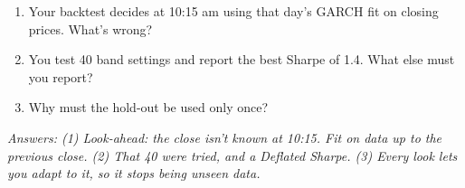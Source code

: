 \documentclass{article}
\begin{document}
\begin{enumerate}

\item Your backtest decides at 10:15 am using that day's GARCH fit on closing prices. What's wrong?

\item You test 40 band settings and report the best Sharpe of 1.4. What else must you report?

\item Why must the hold-out be used only once?

\end{enumerate}

\emph{Answers: (1) Look-ahead: the close isn't known at 10:15. Fit on data up to the previous close. (2) That 40 were tried, and a Deflated Sharpe. (3) Every look lets you adapt to it, so it stops being unseen data.}
\end{document}
